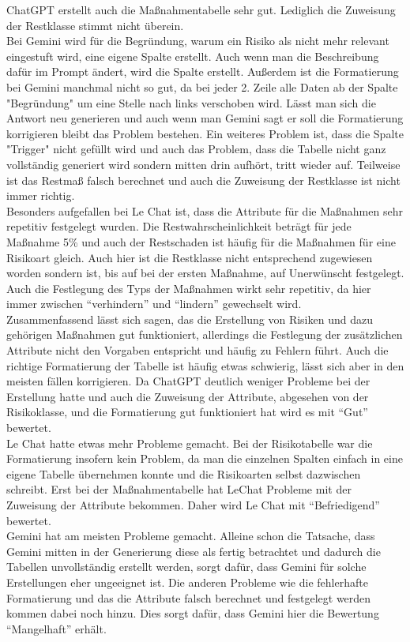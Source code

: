ChatGPT erstellt auch die Maßnahmentabelle sehr gut. Lediglich die Zuweisung der Restklasse stimmt nicht überein.\\

Bei Gemini wird für die Begründung, warum ein Risiko als nicht mehr relevant eingestuft wird, eine eigene Spalte erstellt.
Auch wenn man die Beschreibung dafür im Prompt ändert, wird die Spalte erstellt. Außerdem ist die Formatierung bei Gemini
manchmal nicht so gut, da bei jeder 2. Zeile alle Daten ab der Spalte "Begründung" um eine Stelle nach links verschoben wird.
Lässt man sich die Antwort neu generieren und auch wenn man Gemini sagt er soll die Formatierung korrigieren bleibt das 
Problem bestehen. Ein weiteres Problem ist, dass die Spalte "Trigger" nicht gefüllt wird und auch das Problem, dass
die Tabelle nicht ganz vollständig generiert wird sondern mitten drin aufhört, tritt wieder auf. Teilweise ist das Restmaß 
falsch berechnet und auch die Zuweisung der Restklasse ist nicht immer richtig.\\

Besonders aufgefallen bei Le Chat ist, dass die Attribute für die Maßnahmen sehr repetitiv festgelegt wurden. Die Restwahrscheinlichkeit
beträgt für jede Maßnahme 5\% und auch der Restschaden ist häufig für die Maßnahmen für eine Risikoart gleich. Auch hier ist die 
Restklasse nicht entsprechend zugewiesen worden sondern ist, bis auf bei der ersten Maßnahme, auf Unerwünscht festgelegt. Auch 
die Festlegung des Typs der Maßnahmen wirkt sehr repetitiv, da hier immer zwischen ``verhindern'' und ``lindern'' gewechselt wird.\\

Zusammenfassend lässt sich sagen, das die Erstellung von Risiken und dazu gehörigen Maßnahmen gut funktioniert, allerdings die 
Festlegung der zusätzlichen Attribute nicht den Vorgaben entspricht und häufig zu Fehlern führt. Auch die richtige Formatierung 
der Tabelle ist häufig etwas schwierig, lässt sich aber in den meisten fällen korrigieren. Da ChatGPT deutlich weniger Probleme 
bei der Erstellung hatte und auch die Zuweisung der Attribute, abgesehen von der Risikoklasse, und die Formatierung gut funktioniert
hat wird es mit ``Gut'' bewertet.\\
Le Chat hatte etwas mehr Probleme gemacht. Bei der Risikotabelle war die Formatierung insofern kein Problem, da man die einzelnen 
Spalten einfach in eine eigene Tabelle übernehmen konnte und die Risikoarten selbst dazwischen schreibt. Erst bei der Maßnahmentabelle
hat LeChat Probleme mit der Zuweisung der Attribute bekommen. Daher wird Le Chat mit ``Befriedigend'' bewertet.\\
Gemini hat am meisten Probleme gemacht. Alleine schon die Tatsache, dass Gemini mitten in der Generierung diese als fertig betrachtet 
und dadurch die Tabellen unvollständig erstellt werden, sorgt dafür, dass Gemini für solche Erstellungen eher ungeeignet ist. Die 
anderen Probleme wie die fehlerhafte Formatierung und das die Attribute falsch berechnet und festgelegt werden kommen dabei noch hinzu.
Dies sorgt dafür, dass Gemini hier die Bewertung ``Mangelhaft'' erhält.\\

